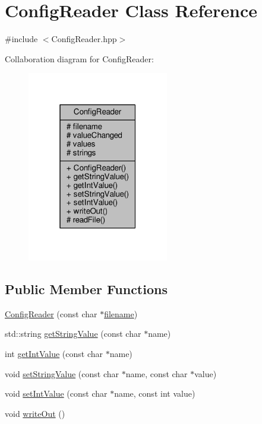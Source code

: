 \hypertarget{class_config_reader}{}\section{Config\+Reader Class Reference}
\label{class_config_reader}


{\ttfamily \#include $<$Config\+Reader.\+hpp$>$}



Collaboration diagram for Config\+Reader\+:\nopagebreak
\begin{figure}[H]
\begin{center}
\leavevmode
\includegraphics[width=175pt]{class_config_reader__coll__graph}
\end{center}
\end{figure}
\subsection*{Public Member Functions}
\begin{DoxyCompactItemize}
\item 
\hyperlink{class_config_reader_a4c1909efc98e8d6308c7871554f68a1a}{Config\+Reader} (const char $\ast$\hyperlink{class_config_reader_a82435410daeab9beb0dc90500976acfc}{filename})
\item 
std\+::string \hyperlink{class_config_reader_a94455bd2a38611704e4b4523b5be538c}{get\+String\+Value} (const char $\ast$name)
\item 
int \hyperlink{class_config_reader_a6843a6aecc2bc7115d1052bafb77df80}{get\+Int\+Value} (const char $\ast$name)
\item 
void \hyperlink{class_config_reader_a91fbf7d656050bd20f17075f6e8c6304}{set\+String\+Value} (const char $\ast$name, const char $\ast$value)
\item 
void \hyperlink{class_config_reader_a82d8f2ba319008e3479f2b4d0b80592a}{set\+Int\+Value} (const char $\ast$name, const int value)
\item 
void \hyperlink{class_config_reader_a40c8fc72bb2a097398c821cfec78ba6e}{write\+Out} ()
\end{DoxyCompactItemize}

